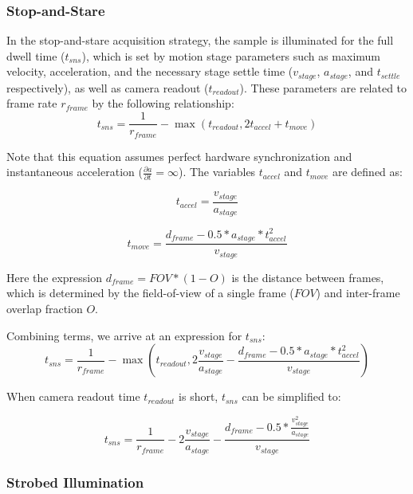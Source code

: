 \subsubsection{Stop-and-Stare}
In the stop-and-stare acquisition strategy, the sample is illuminated for the full dwell time ($t_{sns}$), which is set by motion stage parameters such as maximum velocity, acceleration, and the necessary stage settle time ($v_{stage}$, $a_{stage}$, and $t_{settle}$ respectively), as well as camera readout ($t_{readout}$). These parameters are related to frame rate $r_{frame}$ by the following relationship:
\begin{equation*}
t_{sns} = \frac{1}{r_{frame}} - \max (t_{readout}, 2t_{accel} + t_{move})
\end{equation*}

Note that this equation assumes perfect hardware synchronization and instantaneous acceleration ($\frac{\partial a}{\partial t} = \infty$). The variables $t_{accel}$ and $t_{move}$ are defined as:

\begin{equation*}
t_{accel} = \frac{v_{stage}}{a_{stage}}
\end{equation*}

\begin{equation*}
t_{move} = \frac{d_{frame} - 0.5 * a_{stage} * t_{accel}^2}{v_{stage}}
\end{equation*}

Here the expression $d_{frame} = FOV * (1-O)$ is the distance between frames, which is determined by the field-of-view of a single frame ($FOV$) and inter-frame overlap fraction $O$.

Combining terms, we arrive at an expression for $t_{sns}$:
\begin{equation*}
t_{sns} = \frac{1}{r_{frame}} - \max (t_{readout}, 2\frac{v_{stage}}{a_{stage}} - \frac{d_{frame} - 0.5 * a_{stage} * t_{accel}^2}{v_{stage}})
\end{equation*}

When camera readout time $t_{readout}$ is short, $t_{sns}$ can be simplified to:

\begin{equation*}
t_{sns} = \frac{1}{r_{frame}} - 2\frac{v_{stage}}{a_{stage}} - \frac{d_{frame} - 0.5 * \frac{v_{stage}^2}{a_{stage}}}{v_{stage}}
\end{equation*}

\subsubsection{Strobed Illumination}

